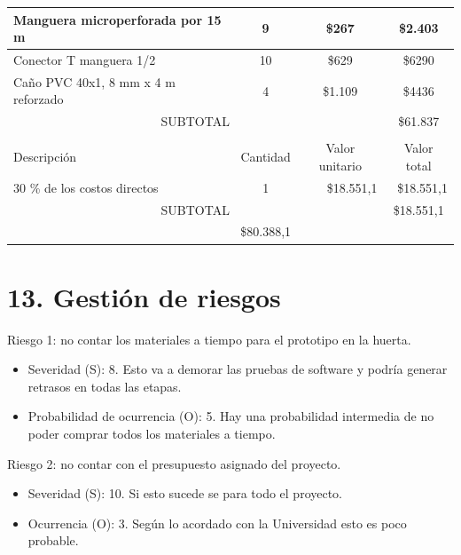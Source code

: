 \documentclass[
11pt, %
codirector, %
]{charter}
\begin{document}
\begin{table}[htpb]
\begin{tabularx}{\linewidth}{@{}|X|c|r|r|@{}}
  Manguera microperforada por 15 m &
  \multicolumn{1}{c|}{9} &
  \multicolumn{1}{c|}{\$267} &
  \multicolumn{1}{c|}{\$2.403} \\ \hline
  
   Conector T manguera 1/2&
  \multicolumn{1}{c|}{10} &
  \multicolumn{1}{c|}{\$629} &
  \multicolumn{1}{c|}{\$6290} \\ \hline
  
  Caño PVC 40x1, 8 mm x 4 m reforzado &
  \multicolumn{1}{c|}{4} &
  \multicolumn{1}{c|}{\$1.109} &
  \multicolumn{1}{c|}{\$4436} \\ \hline 
    
\multicolumn{3}{|c|}{SUBTOTAL} &
  \multicolumn{1}{c|}{\$61.837} \\ \hline
\rowcolor[HTML]{C0C0C0} 
\multicolumn{4}{|c|}{\cellcolor[HTML]{C0C0C0}COSTOS INDIRECTOS} \\ \hline
\rowcolor[HTML]{C0C0C0} 
Descripción &
  \multicolumn{1}{c|}{\cellcolor[HTML]{C0C0C0}Cantidad} &
  \multicolumn{1}{c|}{\cellcolor[HTML]{C0C0C0}Valor unitario} &
  \multicolumn{1}{c|}{\cellcolor[HTML]{C0C0C0}Valor total} \\ \hline
\multicolumn{1}{|l|}{30 \%  de los costos directos} &
  {1} &
  {\$18.551,1} &
  {\$18.551,1} \\ \hline
\multicolumn{3}{|c|}{SUBTOTAL} &
  \multicolumn{1}{c|}{\$18.551,1} \\ \hline
\rowcolor[HTML]{C0C0C0}
\multicolumn{3}{|c|}{TOTAL} & \$80.388,1
   \\ \hline
\end{tabularx}%
\end{table}


\section{13. Gestión de riesgos}
\label{sec:riesgos}
 
Riesgo 1: no contar los materiales a tiempo para el prototipo en la huerta.
\begin{itemize}
	\item Severidad (S): 8.
	Esto va a demorar las pruebas de software y podría generar retrasos en todas las etapas.
	\item Probabilidad de ocurrencia (O): 5.
	Hay una probabilidad intermedia de no poder comprar todos los materiales a tiempo. 
\end{itemize}   

Riesgo 2: no contar con el presupuesto asignado del proyecto.
\begin{itemize}
	\item Severidad (S): 10.
	Si esto sucede se para todo el proyecto.
	\item Ocurrencia (O): 3.
	Según lo acordado con la Universidad esto es poco probable.
\end{itemize}
\end{document}
